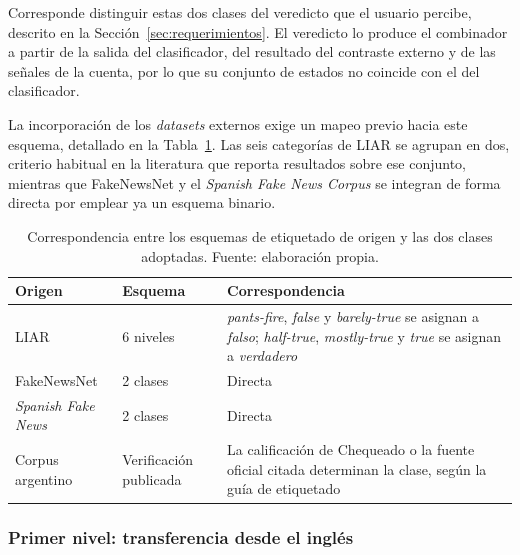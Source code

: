 Corresponde distinguir estas dos clases del veredicto que el usuario percibe, descrito en la Sección~\ref{sec:requerimientos}. El veredicto lo produce el combinador a partir de la salida del clasificador, del resultado del contraste externo y de las señales de la cuenta, por lo que su conjunto de estados no coincide con el del clasificador.

La incorporación de los \textit{datasets} externos exige un mapeo previo hacia este esquema, detallado en la Tabla~\ref{tab:mapeo-etiquetas}. Las seis categorías de LIAR se agrupan en dos, criterio habitual en la literatura que reporta resultados sobre ese conjunto, mientras que FakeNewsNet y el \textit{Spanish Fake News Corpus} se integran de forma directa por emplear ya un esquema binario.

\begin{table}[t]
  \centering
  \caption{Correspondencia entre los esquemas de etiquetado de origen y las dos clases adoptadas. Fuente: elaboración propia.}
  \label{tab:mapeo-etiquetas}
  \begin{tabular}{l l p{7cm}}
    \hline
    \textbf{Origen} & \textbf{Esquema} & \textbf{Correspondencia} \\
    \hline
    LIAR & 6 niveles & \textit{pants-fire}, \textit{false} y \textit{barely-true} se asignan a \textit{falso}; \textit{half-true}, \textit{mostly-true} y \textit{true} se asignan a \textit{verdadero} \\
    FakeNewsNet & 2 clases & Directa \\
    \textit{Spanish Fake News} & 2 clases & Directa \\
    Corpus argentino & Verificación publicada & La calificación de Chequeado o la fuente oficial citada determinan la clase, según la guía de etiquetado \\
    \hline
  \end{tabular}
\end{table}

\subsubsection{Primer nivel: transferencia desde el inglés}

